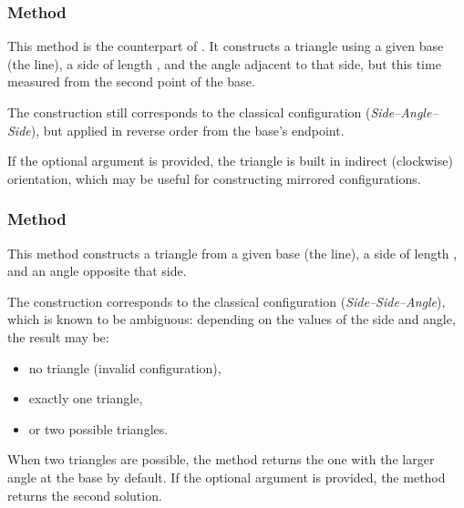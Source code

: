 \subsubsection{Method }
\label{ssub:_line__as_d_an_swap}

This method is the counterpart of . It constructs a triangle using a given base (the line), a side of length , and the angle  adjacent to that side, but this time measured from the second point  of the base.

\medskip
\noindent
The construction still corresponds to the classical  configuration (\textit{Side–Angle–Side}), but applied in reverse order from the base's endpoint.

\medskip
\noindent
If the optional argument  is provided, the triangle is built in indirect (clockwise) orientation, which may be useful for constructing mirrored configurations.

\subsubsection{Method }
\label{ssub:_line_sa}

This method constructs a triangle from a given base (the line), a side of length , and an angle  opposite that side.

\medskip
\noindent
The construction corresponds to the classical  configuration (\emph{Side–Side–Angle}), which is known to be ambiguous: depending on the values of the side and angle, the result may be:

\begin{itemize}
  \item no triangle (invalid configuration),
  \item exactly one triangle,
  \item or two possible triangles.
\end{itemize}

\medskip
\noindent
When two triangles are possible, the method returns the one with the larger angle at the base by default. If the optional argument  is provided, the method returns the second solution.

\vspace{1em}

\begin{center}
\end{center}

